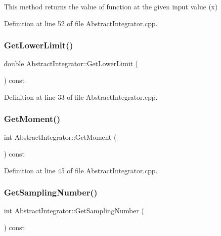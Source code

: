 This method returns the value of function at the given input value (x) 



Definition at line 52 of file Abstract\+Integrator.\+cpp.

\mbox{\label{class_abstract_integrator_ae27a09d1e3fb0a30ce9545a4d8f29cad}} 
\subsubsection{\texorpdfstring{Get\+Lower\+Limit()}{GetLowerLimit()}}
{\footnotesize\ttfamily double Abstract\+Integrator\+::\+Get\+Lower\+Limit (\begin{DoxyParamCaption}{ }\end{DoxyParamCaption}) const}



Definition at line 33 of file Abstract\+Integrator.\+cpp.

\mbox{\label{class_abstract_integrator_a7f709ab302dfe70b5f0f2ce80456fcdb}} 
\subsubsection{\texorpdfstring{Get\+Moment()}{GetMoment()}}
{\footnotesize\ttfamily int Abstract\+Integrator\+::\+Get\+Moment (\begin{DoxyParamCaption}{ }\end{DoxyParamCaption}) const}



Definition at line 45 of file Abstract\+Integrator.\+cpp.

\mbox{\label{class_abstract_integrator_ac58629ec6822b3beeefdd1323b627704}} 
\subsubsection{\texorpdfstring{Get\+Sampling\+Number()}{GetSamplingNumber()}}
{\footnotesize\ttfamily int Abstract\+Integrator\+::\+Get\+Sampling\+Number (\begin{DoxyParamCaption}{ }\end{DoxyParamCaption}) const}



